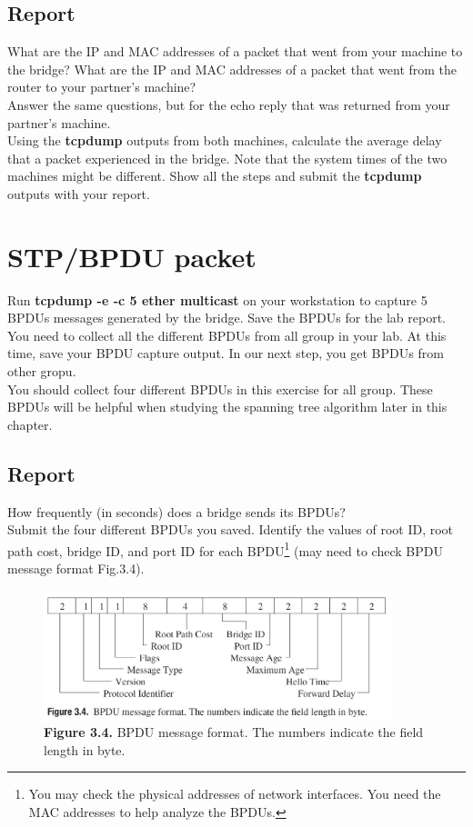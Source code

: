 \documentclass{../UTNetLab}
\begin{document}
    \subsection*{Report}
    What are the IP and MAC addresses of a packet that went from your machine to the bridge?
    What are the IP and MAC addresses of a packet that went from the router to your partner’s machine? \\
    Answer the same questions, but for the echo reply that was returned from your partner’s machine. \\
    Using the \textbf{tcpdump} outputs from both machines, calculate the average delay that a packet experienced in the bridge.
    Note that the system times of the two machines might be different.
    Show all the steps and submit the \textbf{tcpdump} outputs with your report.


\section{STP/BPDU packet}
    Run \textbf{tcpdump -e -c 5 ether multicast} on your workstation to capture 5 BPDUs messages generated by the bridge.
    Save the BPDUs for the lab report. \\
    You need to collect all the different BPDUs from all group in your lab.
    At this time, save your BPDU capture output. 
    In our next step,  you get BPDUs from other gropu. \\
    You should collect four different BPDUs in this exercise for all group.
    These BPDUs will be helpful when studying the spanning tree algorithm later in this chapter.

    \subsection*{Report}
    How frequently (in seconds) does a bridge sends its BPDUs? \\
    Submit the four different BPDUs you saved.
    Identify the values of root ID, root path cost, bridge ID, and port ID for each BPDU\footnote{You may check the physical addresses of network interfaces. You need the MAC addresses to help analyze the BPDUs.} (may need to check BPDU message format Fig.3.4).

    \begin{figure}[H]
        \centering
        \includegraphics[width=0.9\textwidth]{img/figure3-4.jpg}
        \caption{\textbf{Figure 3.4.} BPDU message format. The numbers indicate the field length in byte.}
    \end{figure}
\end{document}
